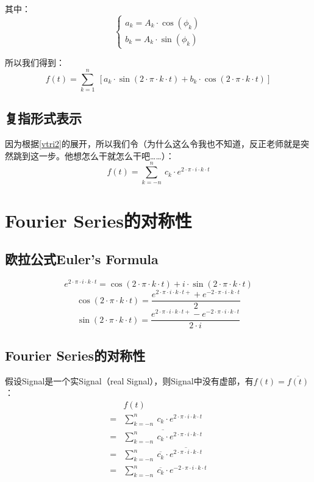 其中：
$$
	\left\{
	\begin{array}{lr}
		a_k=A_k\cdot \cos(\phi_k) \\
		b_k=A_k\cdot \sin(\phi_k)
	\end{array}
	\right.
$$

所以我们得到：
\begin{equation}\label{vtri2}
	f(t) =\sum\limits_{k=1}^n\ [a_k\cdot \sin(2\cdot\pi\cdot k\cdot t) +b_k\cdot \cos(2\cdot \pi\cdot k\cdot t)]
\end{equation}
\subsection{复指形式表示}
因为根据\eqref{vtri2}的展开，所以我们令（为什么这么令我也不知道，反正老师就是突然跳到这一步。他想怎么干就怎么干吧……）：
\begin{equation}
	f(t)=\sum\limits_{k=-n}^n\ c_k\cdot e^{2\cdot \pi \cdot i \cdot k \cdot t}
\end{equation}

\section{Fourier Series的对称性}
\subsection{欧拉公式Euler's Formula}
\begin{equation}
	e^{2\cdot \pi\cdot i\cdot k\cdot t} =  \cos(2\cdot \pi\cdot k\cdot t)+i\cdot \sin(2\cdot \pi\cdot k\cdot t)
\end{equation}
\begin{equation}
	\cos(2\cdot \pi\cdot k\cdot t)=\frac{e^{2\cdot \pi\cdot i\cdot k\cdot t+}+e^{-2\cdot \pi\cdot i\cdot k\cdot t}}{2}
\end{equation}
\begin{equation}
	\sin(2\cdot \pi\cdot k\cdot t)=\frac{e^{2\cdot \pi\cdot i\cdot k\cdot t+}-e^{-2\cdot \pi\cdot i\cdot k\cdot t}}{2\cdot i}
\end{equation}
\subsection{Fourier Series的对称性}
假设​Signal是一个实Signal（real Signal），则Signal中没有虚部，有​$f(t)=\overline {f(t)}$：
\begin{align*}
	  & f(t)                                                                                        \\
	= & \sum\limits_{k=-n}^n\ c_k\cdot e^{2\cdot \pi \cdot i \cdot k \cdot t}                       \\
	= & \overline{\sum\limits_{k=-n}^n\ c_k\cdot e^{2\cdot \pi \cdot i \cdot k \cdot t}}            \\
	= & \sum\limits_{k=-n}^n\ \overline{c_k}\cdot \overline{e^{2\cdot \pi \cdot i \cdot k \cdot t}} \\
	= & \sum\limits_{k=-n}^n\ \overline{c_k}\cdot e^{-2\cdot \pi \cdot i \cdot k \cdot t}
\end{align*}

